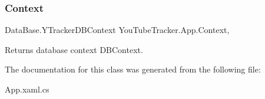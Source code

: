 \subsubsection{\texorpdfstring{Context}{Context}}
{\footnotesize\ttfamily Data\+Base.\+Y\+Tracker\+D\+B\+Context You\+Tube\+Tracker.\+App.\+Context\hspace{0.3cm}{\ttfamily [static]}, {\ttfamily [get]}}



Returns database context {\ttfamily D\+B\+Context}. 



The documentation for this class was generated from the following file\+:\begin{DoxyCompactItemize}
\item 
App.\+xaml.\+cs\end{DoxyCompactItemize}
